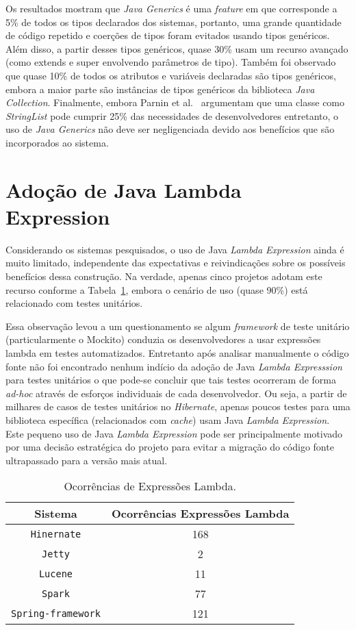 Os resultados mostram que \textit{Java Generics} é uma \textit{feature} em que corresponde a 5\% de todos os tipos declarados dos sistemas, portanto, uma grande quantidade de código repetido e coerções de tipos foram evitados usando tipos genéricos. Além disso, a partir desses tipos genéricos, quase 30\% usam um recurso avançado (como extends e super envolvendo parâmetros de tipo). Também foi observado que quase 10\% de todos os atributos e variáveis declaradas são tipos genéricos, embora a maior parte são instâncias de tipos genéricos da biblioteca \textit{Java Collection}. Finalmente, embora Parnin et al.~\cite{Parnin:ACM2011} argumentam que uma classe como \textit{StringList} pode cumprir 25\% das necessidades de desenvolvedores entretanto, o uso de \textit{Java Generics} não deve ser negligenciada devido aos benefícios que são incorporados ao sistema.



\section{Adoção de Java Lambda Expression}
Considerando os sistemas pesquisados, o uso de Java \textit{Lambda Expression} ainda é muito limitado, independente das expectativas e reivindicações sobre os possíveis benefícios dessa construção. Na verdade, apenas cinco projetos adotam este recurso conforme a Tabela~\ref{tab:adocaoLambda}, embora o cenário de uso (quase 90\%) está relacionado com testes unitários. 

Essa observação levou a um questionamento se algum 
\textit{framework} de teste unitário (particularmente o 
Mockito) conduzia os desenvolvedores 
a usar expressões lambda em testes automatizados. 
Entretanto após analisar manualmente o código fonte não foi encontrado nenhum indício da adoção de Java\textit{ Lambda Expresssion} para testes unitários o que pode-se concluir que tais testes ocorreram de forma \textit{ad-hoc} através de esforços individuais de cada desenvolvedor.
Ou seja, a partir de milhares de casos de testes unitários no \textit{Hibernate}, apenas poucos testes para uma biblioteca específica (relacionados com \textit{cache}) usam Java\textit{ Lambda Expression}. Este pequeno uso de Java\textit{ Lambda Expression} pode ser principalmente motivado por uma decisão estratégica do projeto para evitar a migração do código fonte ultrapassado para a versão mais atual.

\begin{table}[h]
	\centering
	\caption{Ocorrências de Expressões Lambda.}
	\begin{tabular}{cc}
		\hline
		Sistema & Ocorrências Expressões Lambda\\ 
		\hline \hline
		\texttt{Hinernate} & 168 \\ 
		\texttt{Jetty} & 2 \\ 
		\texttt{Lucene} & 11 \\ 
		\texttt{Spark} & 77 \\ 
		\texttt{Spring-framework} & 121 \\ \hline
	\end{tabular}
	\label{tab:adocaoLambda} %
\end{table}


